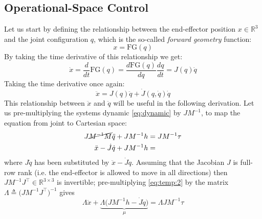 	\subsection{Operational-Space Control} 
	Let us start by defining the relationship between the end-effector position $x \in \mathds{R}^3$ and the joint configuration $q$, which is the so-called \emph{forward geometry} function:
	\begin{equation}
	x = \text{FG}(q)
	\end{equation}
	By taking the time derivative of this relationship we get:
	\begin{equation}
	\dot x = \frac{d}{dt} \text{FG}(q) = \frac{d \text{FG}(q)}{dq} \frac{dq}{dt} = J(q) \dot q
	\end{equation}
	Taking the time derivative once again:
	\begin{equation}
	\ddot x = J(q) \ddot q + \dot{J}(q, \dot q) \dot q
	\end{equation}
	This relationship between $\ddot x$ and $\ddot q$ will be useful in the following derivation.
	Let us pre-multiplying the systems dynamic \eqref{eq:dynamic} by $JM^{-1}$, to map the equation from joint to Cartesian space:
	\begin{equation} \label{eq:temp:2}
	\begin{split}
		J\cancel{M^{-1}M}\ddot q + JM^{-1} h & = JM^{-1} \tau \\
		\ddot x - \dot J \dot q + JM^{-1}h & =
	\end{split}
	\end{equation}
	where $J \ddot q$ has been substituted by $\ddot x - \dot J \dot q$. 
	Assuming that the Jacobian $J$ is full-row rank (i.e. the end-effector is allowed to move in all directions) then $JM^{-1}J^\top \in \mathds R^{3 \times 3}$ is invertible; pre-multiplying \eqref{eq:temp:2} by the matrix $\Lambda \triangleq \big(JM^{-1}J^\top\big)^{-1}$ gives
	\begin{equation*}
		\Lambda \ddot x + \underbrace{\Lambda\big(JM^{-1}h - \dot J \dot q\big)}_{\mu} = \Lambda J M^{-1}\tau
	\end{equation*}
	
